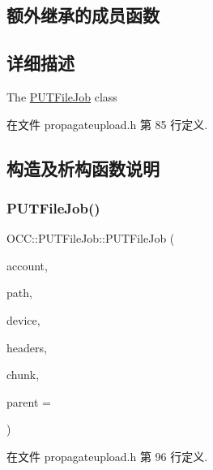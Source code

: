 \subsection*{额外继承的成员函数}


\subsection{详细描述}
The \hyperlink{class_o_c_c_1_1_p_u_t_file_job}{P\+U\+T\+File\+Job} class 

在文件 propagateupload.\+h 第 85 行定义.



\subsection{构造及析构函数说明}
\mbox{\label{class_o_c_c_1_1_p_u_t_file_job_abe6f5be9a0e50186f8ca4ac0735d358b}} 
\subsubsection{\texorpdfstring{P\+U\+T\+File\+Job()}{PUTFileJob()}\hspace{0.1cm}{\footnotesize\ttfamily [1/2]}}
{\footnotesize\ttfamily O\+C\+C\+::\+P\+U\+T\+File\+Job\+::\+P\+U\+T\+File\+Job (\begin{DoxyParamCaption}\item[{\hyperlink{namespace_o_c_c_a848616aedb9188e223c6b9867757fe69}{Account\+Ptr}}]{account,  }\item[{const Q\+String \&}]{path,  }\item[{Q\+I\+O\+Device $\ast$}]{device,  }\item[{const Q\+Map$<$ Q\+Byte\+Array, Q\+Byte\+Array $>$ \&}]{headers,  }\item[{int}]{chunk,  }\item[{Q\+Object $\ast$}]{parent = {} }\end{DoxyParamCaption})\hspace{0.3cm}{\ttfamily [explicit]}}



在文件 propagateupload.\+h 第 96 行定义.

\mbox{\label{class_o_c_c_1_1_p_u_t_file_job_a218efbe1ced27176f246a8622be4ac3b}} 
